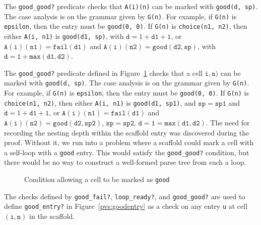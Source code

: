 \documentclass[letter]{llncs}
\begin{document}
% 			

                      The \texttt{good\_good?} predicate checks that \texttt{A(i)(n)} can be marked
                      with \texttt{good(d, sp)}\@.  The case analysis is on the grammar given by \texttt{G(n)}\@.  For example, if \texttt{G(n)} is \texttt{epsilon}, then the entry must be \texttt{good(0, 0)}\@.  If \texttt{G(n)} is \texttt{choice(n1, n2)}, then either \texttt{A(i, n1)} is \texttt{good(d1, sp)}, with $\mathtt{d} = 1 + \mathtt{d1 + 1}$, or
$\mathtt{A(i)(n1)} = \mathtt{fail(d1)}$ and $\mathtt{A(i)(n2)} = \mathtt{good(d2, sp)}$, with $\mathtt{d} = \mathtt{1 + max(d1, d2)}$\@.  
                      



The \texttt{good\_good?} predicate defined in
Figure~\ref{pvs:goodgood} checks that a cell $\mathtt{i, n})$ can be
marked with \texttt{good(d, sp)}\@.  The case analysis is on the
grammar given by \texttt{G(n)}\@.  For example, if \texttt{G(n)} is
\texttt{epsilon}, then the entry must be \texttt{good(0, 0)}\@.  If
\texttt{G(n)} is \texttt{choice(n1, n2)}, then either \texttt{A(i,
  n1)} is \texttt{good(d1, sp1)}, and $\mathtt{sp} = \mathtt{sp1}$ and
$\mathtt{d} = 1 + \mathtt{d1 + 1}$, or
$\mathtt{A(i)(n1)} = \mathtt{fail(d1)}$ and
$\mathtt{A(i)(n2)} = \mathtt{good(d2, sp2)}$,
$\mathtt{sp} = \mathtt{sp2}$,
$\mathtt{d} = \mathtt{1 = max(d1, d2)}$\@.
The need for recording the nesting depth within the scaffold entry was
discovered during the proof.  Without it, we run into a problem where
a scaffold could mark a cell with a self-loop with a \texttt{good} entry. 
This would satisfy the \texttt{good\_good?} condition, but there would be no
way to construct a well-formed parse tree from such a loop.  

\begin{figure}[h!]
  
    \vspace*{-4mm}
			\caption{Condition allowing a cell to be marked as \texttt{good}}
			\label{pvs:goodgood}
\end{figure}

The checks defined by \texttt{good\_fail?}, \texttt{loop\_ready?}, and \texttt{good\_good?} are used to define \texttt{good\_entry?} in Figure~\ref{pvs:goodentry}
as a check on any entry \texttt{u}
at cell $(\mathtt{i, n})$ in the scaffold.  
\end{document}
